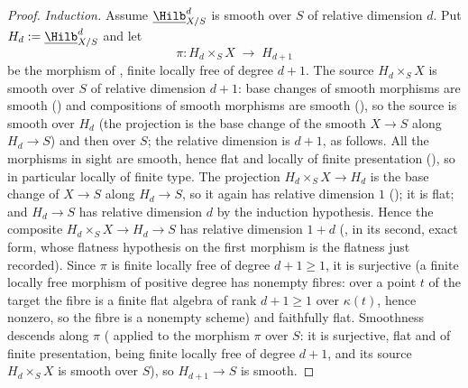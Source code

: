 \begin{proof}
\emph{Induction.}  Assume $\underline{\Hilb}^d_{X/S}$ is smooth over
$S$ of relative dimension $d$.  Put $H_d:=\underline{\Hilb}^d_{X/S}$
and let
\[
\pi:H_d\times_SX\;\longrightarrow\;H_{d+1}
\]
be the morphism of , finite locally free of
degree $d+1$.  The source $H_d\times_SX$ is smooth over $S$ of
relative dimension $d+1$: base changes of smooth morphisms are smooth
() and compositions of smooth
morphisms are smooth (), so the source is smooth over
$H_d$ (the projection is the base change of the smooth
$X\to S$ along $H_d\to S$) and then over $S$; the relative dimension
is $d+1$, as follows.  All the morphisms in sight are smooth, hence
flat and locally of finite presentation
(), so in particular locally of finite type.
The projection $H_d\times_SX\to H_d$ is the base change of $X\to S$
along $H_d\to S$, so it again has relative dimension $1$
(); it is flat; and
$H_d\to S$ has relative dimension $d$ by the induction hypothesis.
Hence the composite $H_d\times_SX\to H_d\to S$ has relative dimension
$1+d$ (, in its second,
exact form, whose flatness hypothesis on the first morphism is the
flatness just recorded).
Since $\pi$ is finite locally free of degree $d+1\ge1$, it is
surjective (a finite locally free morphism of positive degree has
nonempty fibres: over a point $t$ of the target the fibre is a
finite flat algebra of rank $d+1\ge1$ over $\kappa(t)$, hence nonzero,
so the fibre is a nonempty scheme) and faithfully flat.  Smoothness
descends along $\pi$
( applied to the morphism $\pi$ over
$S$: it is surjective, flat and of finite presentation, being finite
locally free of degree $d+1$, and its source $H_d\times_SX$ is smooth
over $S$), so $H_{d+1}\to S$ is smooth.


\end{proof}
